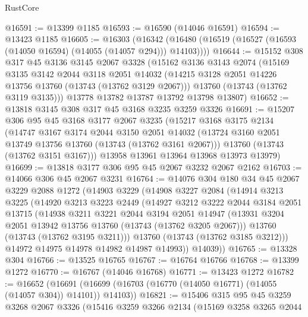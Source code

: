\begin{lexlean}{RustCore}
\begin{coremodule}
@16591 := @13399 @1185
@16593 := @16590 (@14046 @16591)
@16594 := @13423 @1185
@16605 := @16303
    (@16342 (@16480 (@16519 (@16527 (@16593 (@14050 @16594) (@14055 (@14057 @294))) @14103))))
@16644 := @15152
    @308
    @317
    @45
    @3136
    @3145
    @2067
    @3328
    (@15162
      @3136
      @3143
      @2074
      (@15169
        @3135
        @3142
        @2044
        @3118
        @2051
        @14032
        (@14215 @3128 @2051 @14226 @13756 @13760 (@13743 (@13762 @3129 @2067)))
        @13760
        (@13743 (@13762 @3119 @3135)))
      @13778
      @13782
      @13787
      @13792
      @13798
      @13807)
@16652 := @13818 @3145 @308 @317 @45 @3168 @3235 @3259 @3326
@16691 := @15207
    @306
    @95
    @45
    @3168
    @3177
    @2067
    @3235
    (@15217
      @3168
      @3175
      @2134
      (@14747
        @3167
        @3174
        @2044
        @3150
        @2051
        @14032
        (@13724 @3160 @2051 @13749 @13756 @13760 (@13743 (@13762 @3161 @2067)))
        @13760
        (@13743 (@13762 @3151 @3167)))
      @13958
      @13961
      @13964
      @13968
      @13973
      @13979)
@16699 := @13818 @3177 @306 @95 @45 @2067 @3232 @2067 @2162
@16703 := @14066 @306 @45 @2067 @3231
@16764 := @14076
    @304
    @180
    @34
    @45
    @2067
    @3229
    @2088
    @1272
    (@14903
      @3229
      (@14908
        @3227
        @2084
        (@14914
          @3213
          @3225
          (@14920
            @3213
            @3223
            @2449
            (@14927
              @3212
              @3222
              @2044
              @3184
              @2051
              @13715
              (@14938
                @3211
                @3221
                @2044
                @3194
                @2051
                @14947
                (@13931 @3204 @2051 @13942 @13756 @13760 (@13743 (@13762 @3205 @2067)))
                @13760
                (@13743 (@13762 @3195 @3211)))
              @13760
              (@13743 (@13762 @3185 @3212)))
            @14972
            @14975
            @14978
            @14982
            @14987
            @14993))
        @14039))
@16765 := @13328 @304
@16766 := @13525 @16765
@16767 := @16764 @16766
@16768 := @13399 @1272
@16770 := @16767 (@14046 @16768)
@16771 := @13423 @1272
@16782 := @16652
    (@16691 (@16699 (@16703 (@16770 (@14050 @16771) (@14055 (@14057 @304)) @14101)) @14103))
@16821 := @15406
    @315
    @95
    @45
    @3259
    @3268
    @2067
    @3326
    (@15416
      @3259
      @3266
      @2134
      (@15169
        @3258
        @3265
        @2044

\end{coremodule}
\end{lexlean}
